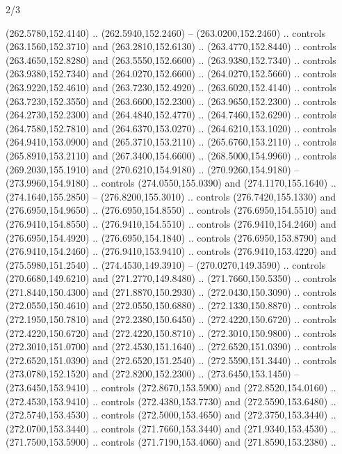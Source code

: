 \begin{flagdescription}{2/3}
\begin{scope}[xshift=0.5\flaglength,yshift=0.5\flagwidth,scale=\flagwidth/259.2]
\begin{scope}[y=0.8pt, x=0.8pt, yscale=-1,shift={(-243,-162)}]
      (262.5780,152.4140) .. (262.5940,152.2460) -- (263.0200,152.2460) .. controls
      (263.1560,152.3710) and (263.2810,152.6130) .. (263.4770,152.8440) .. controls
      (263.4650,152.8280) and (263.5550,152.6600) .. (263.9380,152.7340) .. controls
      (263.9380,152.7340) and (264.0270,152.6600) .. (264.0270,152.5660) .. controls
      (263.9220,152.4610) and (263.7230,152.4920) .. (263.6020,152.4140) .. controls
      (263.7230,152.3550) and (263.6600,152.2300) .. (263.9650,152.2300) .. controls
      (264.2730,152.2300) and (264.4840,152.4770) .. (264.7460,152.6290) .. controls
      (264.7580,152.7810) and (264.6370,153.0270) .. (264.6210,153.1020) .. controls
      (264.9410,153.0900) and (265.3710,153.2110) .. (265.6760,153.2110) .. controls
      (265.8910,153.2110) and (267.3400,154.6600) .. (268.5000,154.9960) .. controls
      (269.2030,155.1910) and (270.6210,154.9180) .. (270.9260,154.9180) --
      (273.9960,154.9180) .. controls (274.0550,155.0390) and (274.1170,155.1640) ..
      (274.1640,155.2850) -- (276.8200,155.3010) .. controls (276.7420,155.1330) and
      (276.6950,154.9650) .. (276.6950,154.8550) .. controls (276.6950,154.5510) and
      (276.9410,154.8550) .. (276.9410,154.5510) .. controls (276.9410,154.2460) and
      (276.6950,154.4920) .. (276.6950,154.1840) .. controls (276.6950,153.8790) and
      (276.9410,154.2460) .. (276.9410,153.9410) .. controls (276.9410,153.4220) and
      (275.5980,151.2540) .. (274.4530,149.3910) -- (270.0270,149.3590) .. controls
      (270.6680,149.6210) and (271.2770,149.8480) .. (271.7660,150.5350) .. controls
      (271.8440,150.4300) and (271.8870,150.2930) .. (272.0430,150.3090) .. controls
      (272.0550,150.4610) and (272.0550,150.6880) .. (272.1330,150.8870) .. controls
      (272.1950,150.7810) and (272.2380,150.6450) .. (272.4220,150.6720) .. controls
      (272.4220,150.6720) and (272.4220,150.8710) .. (272.3010,150.9800) .. controls
      (272.3010,151.0700) and (272.4530,151.1640) .. (272.6520,151.0390) .. controls
      (272.6520,151.0390) and (272.6520,151.2540) .. (272.5590,151.3440) .. controls
      (273.0780,152.1520) and (272.8200,152.2300) .. (273.6450,153.1450) --
      (273.6450,153.9410) .. controls (272.8670,153.5900) and (272.8520,154.0160) ..
      (272.4530,153.9410) .. controls (272.4380,153.7730) and (272.5590,153.6480) ..
      (272.5740,153.4530) .. controls (272.5000,153.4650) and (272.3750,153.3440) ..
      (272.0700,153.3440) .. controls (271.7660,153.3440) and (271.9340,153.4530) ..
      (271.7500,153.5900) .. controls (271.7190,153.4060) and (271.8590,153.2380) ..

\end{scope}
\end{scope}
\end{flagdescription}
